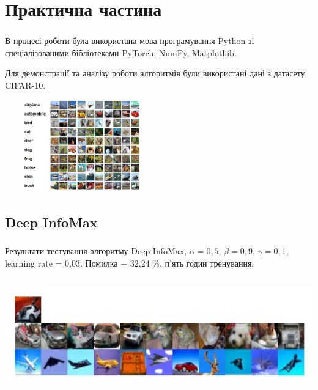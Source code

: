 \documentclass[c]{beamer}
\begin{document}
\section{Практична частина}

\begin{frame}
	\frametitle{\insertsection}
	
	В процесі роботи була використана мова програмування Python зі спеціалізованими бібліотеками PyTorch, NumPy, Matplotliib.\pause
	
	
	Для демонстрації та аналізу роботи алгоритмів були використані дані з датасету CIFAR-10.


  	\centering\includegraphics[width=0.5\textwidth, height=4cm, natwidth=471, natheight=370]{cifar10.jpg}

\end{frame}

\subsection{Deep InfoMax}

\begin{frame}
	\frametitle{\insertsection}
	\framesubtitle{\insertsubsection}

	Результати тестування алгоритму Deep InfoMax, $\alpha = 0,5$, $\beta = 0,9$, $\gamma = 0,1$, learning rate = 0,03. Помилка $-$ 32,24 \%, п'ять годин тренування.
		
    \includegraphics[width=\textwidth, height=5cm, natwidth=375, natheight=121]{deepinfodemo3.jpg}


\end{frame}
\end{document}
